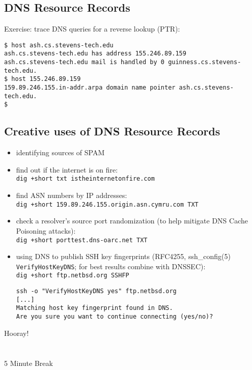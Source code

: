 \documentclass[xga]{xdvislides}
\begin{document}
\subsection{DNS Resource Records}
Exercise: trace DNS queries for a reverse lookup (PTR):
\\

\begin{verbatim}
$ host ash.cs.stevens-tech.edu
ash.cs.stevens-tech.edu has address 155.246.89.159
ash.cs.stevens-tech.edu mail is handled by 0 guinness.cs.stevens-tech.edu.
$ host 155.246.89.159
159.89.246.155.in-addr.arpa domain name pointer ash.cs.stevens-tech.edu.
$ 
\end{verbatim}

\subsection{Creative uses of DNS Resource Records}
\begin{itemize}
	\item identifying sources of SPAM
	\item find out if the internet is on fire: \\
		\verb|dig +short txt istheinternetonfire.com|
	\item find ASN numbers by IP addresses: \\
		\verb|dig +short 159.89.246.155.origin.asn.cymru.com TXT|
	\item check a resolver's source port randomization (to help
		mitigate DNS Cache Poisoning attacks): \\
		\verb|dig +short porttest.dns-oarc.net TXT|
	\item using DNS to publish SSH key fingerprints (RFC4255,
ssh\_config(5) \verb+VerifyHostKeyDNS+; for best results combine with DNSSEC): \\
		\verb|dig +short ftp.netbsd.org SSHFP|
		\begin{verbatim}
ssh -o "VerifyHostKeyDNS yes" ftp.netbsd.org
[...]
Matching host key fingerprint found in DNS.
Are you sure you want to continue connecting (yes/no)?
\end{verbatim}
\end{itemize}

\newpage
\vspace*{\fill}
\begin{center}
    \Hugesize
        Hooray! \\ [1em]
    \hspace*{5mm}
    \blueline\\
    \hspace*{5mm}\\
        5 Minute Break
\end{center}
\vspace*{\fill}
\end{document}
